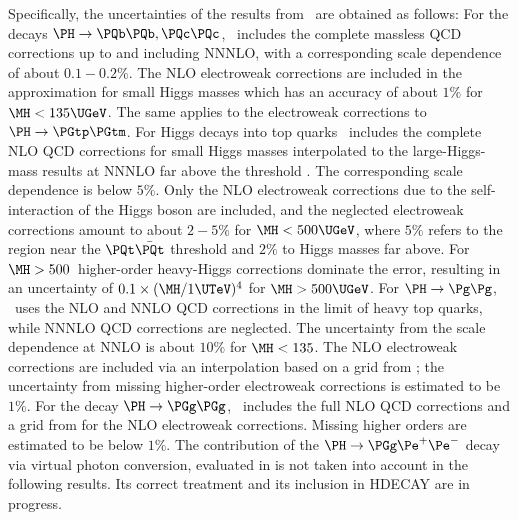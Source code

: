 Specifically, the uncertainties of the results from \HDECAY\ are
obtained as follows: For the decays $\PH \to \PQb\PQb, \PQc\PQc$,
\HDECAY\ includes the complete massless QCD corrections up to and
including NNNLO, with a corresponding scale dependence of about
$0.1{-}0.2\%$. The NLO electroweak corrections
\cite{Fleischer:1980ub,Bardin:1990zj,Dabelstein:1991ky,Kniehl:1991ze}
are included in the approximation for small Higgs masses
\cite{Accomando:1997wt} which has an accuracy of about $1\%$ for $\MH <
135\UGeV$.  The same applies to the electroweak corrections to $\PH \to
\PGtp \PGtm$.  For Higgs decays into top quarks \HDECAY\ includes
the complete NLO QCD corrections for small Higgs masses
\cite{Braaten:1980yq,Sakai:1980fa,Inami:1980qp,Gorishnii:1983cu,Drees:1989du,Drees:1990dq,Drees:1991dq}
interpolated to the large-Higgs-mass results at NNNLO far above the
threshold
\cite{Gorishnii:1990zu,Gorishnii:1991zr,Kataev:1993be,Surguladze:1994gc,Larin:1995sq,Chetyrkin:1995pd,Chetyrkin:1996sr}.
The corresponding scale dependence is below $5\%$.  Only the NLO
electroweak corrections due to the self-interaction of the Higgs boson
are included, and the neglected electroweak corrections amount to
about $2{-}5\%$ for $\MH < 500\UGeV$, where $5\%$ refers to the region near
the $\PQt\bar\PQt$ threshold and $2\%$ to Higgs masses far above.  For
$\MH > 500$\UGeV\ higher-order heavy-Higgs corrections
\cite{Ghinculov:1994se,Ghinculov:1995err,Durand:1994pk,Durand:1994err,Durand:1994pw,Borodulin:1996br}
dominate the error, resulting in an uncertainty of
$0.1\times(\MH/1\UTeV)^4$ for $\MH > 500\UGeV$.  For $\PH \to \Pg\Pg$,
\HDECAY\ uses the NLO \cite{Inami:1982xt,Djouadi:1991tka,Spira:1995rr}
and NNLO \cite{Chetyrkin:1997iv} QCD corrections in the limit of heavy
top quarks, while NNNLO QCD corrections \cite{Baikov:2006ch} are
neglected.  The uncertainty from the scale dependence at NNLO is about
$10\%$ for $\MH < 135$\UGeV. The NLO electroweak corrections are included
via an interpolation based on a grid from ; the
uncertainty from missing higher-order electroweak corrections is
estimated to be $1\%$.  For the decay $\PH\to\PGg \PGg$, \HDECAY\
includes the full NLO QCD corrections
\cite{Zheng:1990qa,Djouadi:1990aj,Dawson:1992cy,Djouadi:1993ji,Melnikov:1993tj,Inoue:1994jq,Spira:1995rr}
and a grid from \Bref{Actis:2008ug} for the NLO electroweak corrections.
Missing higher orders are estimated to be below $1\%$. The contribution of
the $\PH \rightarrow \PGg \Pe^{+}\Pe^{-}$ decay via virtual photon conversion,
evaluated in \Bref{Firan:2007tp} is not taken into account in the following results. Its correct treatment and its inclusion in HDECAY are in progress.


